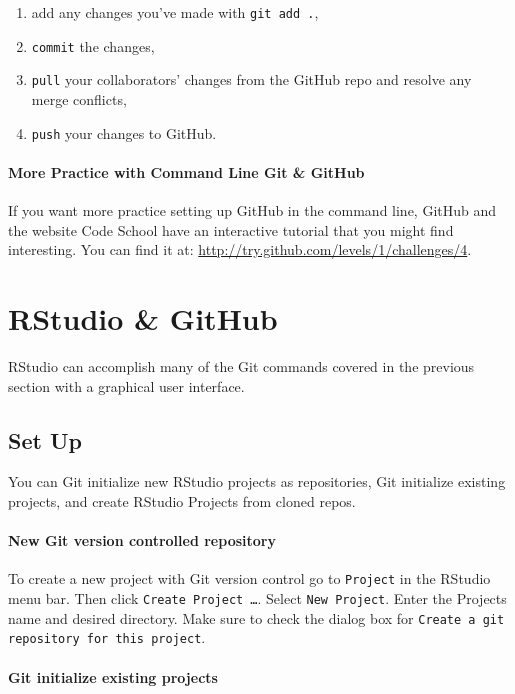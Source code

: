 \begin{enumerate}
    \item add any changes you've made with \texttt{git add .},
    \item \texttt{commit} the changes,
    \item \texttt{pull} your collaborators' changes from the GitHub repo and resolve any merge conflicts,
    \item \texttt{push} your changes to GitHub. 
\end{enumerate}

\paragraph{More Practice with Command Line Git \& GitHub}

If you want more practice setting up GitHub in the command line, GitHub and the website Code School have an interactive tutorial that you might find interesting. You can find it at: \url{http://try.github.com/levels/1/challenges/4}.

\section{RStudio \& GitHub}

RStudio can accomplish many of the Git commands covered in the previous section with a graphical user interface. 

\subsection{Set Up}

You can Git initialize new RStudio projects as repositories, Git initialize existing projects, and create RStudio Projects from cloned repos. 

\paragraph{New Git version controlled repository}
To create a new project with Git version control go to \texttt{Project} in the RStudio menu bar. Then click \texttt{Create Project \ldots}. Select \texttt{New Project}. Enter the Projects name and desired directory. Make sure to check the dialog box for \texttt{Create a git repository for this project}. 

\paragraph{Git initialize existing projects}


